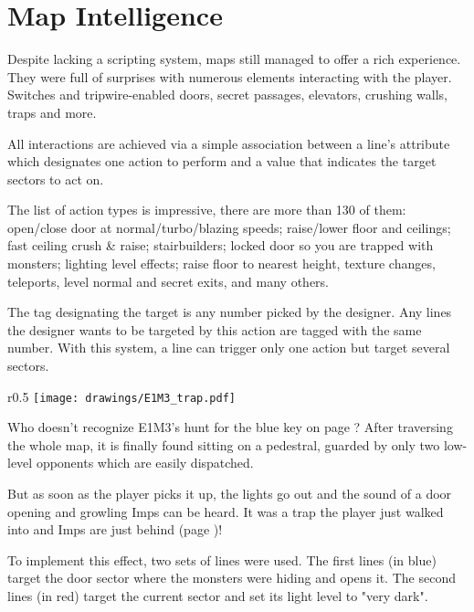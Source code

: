 \section{Map Intelligence}
Despite lacking a scripting system, maps still managed to offer a rich experience. They were full of surprises with numerous elements interacting with the player. Switches and tripwire-enabled doors, secret passages, elevators, crushing walls, traps and more.\\
\par
{}
\par
All interactions are achieved via a simple association between a line's  attribute which designates one action to perform and a  value that indicates the target sectors to act on.\\
\par
The list of action types is impressive, there are more than 130 of them: open/close door at normal/turbo/blazing speeds; raise/lower floor and ceilings; fast ceiling crush \& raise; stairbuilders; locked door so you are trapped with monsters; lighting level effects; raise floor to nearest height, texture changes, teleports, level normal and secret exits, and many others.\\
\par
The tag designating the target is any number picked by the designer. Any lines the designer wants to be targeted by this action are tagged with the same number. With this system, a line can trigger only one action but target several sectors.\\
\par
{}
\pagebreak






\begin{wrapfigure}[17]{r}{0.5\textwidth}
\centering
\texttt{[image: drawings/E1M3\_trap.pdf]}
\end{wrapfigure}
Who doesn't recognize E1M3's hunt for the blue key on page \pageref{e1m3_trap}? After traversing the whole map, it is finally found sitting on a pedestral, guarded by only two low-level opponents which are easily dispatched.\\
\par
But as soon as the player picks it up, the lights go out and the sound of a door opening and growling Imps can be heard. It was a trap the player just walked into and Imps are just behind (page \pageref{e1m3_trap})!\\
\par
To implement this effect, two sets of lines were used. The first lines (in blue) target the door sector where the monsters were hiding and opens it. The second lines (in red) target the current sector and set its light level to "very dark".\\
\par



